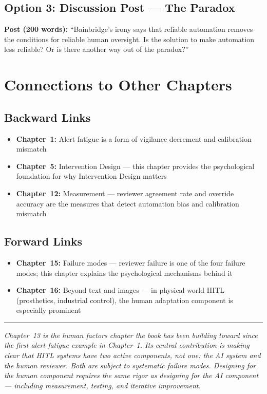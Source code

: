 \subsection{Option 3: Discussion Post --- The Paradox}

\textbf{Post (200 words):} ``Bainbridge's irony says that reliable automation removes the conditions for reliable human oversight. Is the solution to make automation less reliable? Or is there another way out of the paradox?''

\section{Connections to Other Chapters}

\subsection{Backward Links}
\begin{itemize}
    \item \textbf{Chapter~1:} Alert fatigue is a form of vigilance decrement and calibration mismatch
    \item \textbf{Chapter~5:} Intervention Design --- this chapter provides the psychological foundation for why Intervention Design matters
    \item \textbf{Chapter~12:} Measurement --- reviewer agreement rate and override accuracy are the measures that detect automation bias and calibration mismatch
\end{itemize}

\subsection{Forward Links}
\begin{itemize}
    \item \textbf{Chapter~15:} Failure modes --- reviewer failure is one of the four failure modes; this chapter explains the psychological mechanisms behind it
    \item \textbf{Chapter~16:} Beyond text and images --- in physical-world HITL (prosthetics, industrial control), the human adaptation component is especially prominent
\end{itemize}

\bigskip
\begin{center}
\rule{0.5\textwidth}{0.4pt}
\end{center}
\bigskip

\noindent\textit{Chapter~13 is the human factors chapter the book has been building toward since the first alert fatigue example in Chapter~1. Its central contribution is making clear that HITL systems have two active components, not one: the AI system and the human reviewer. Both are subject to systematic failure modes. Designing for the human component requires the same rigor as designing for the AI component --- including measurement, testing, and iterative improvement.}
